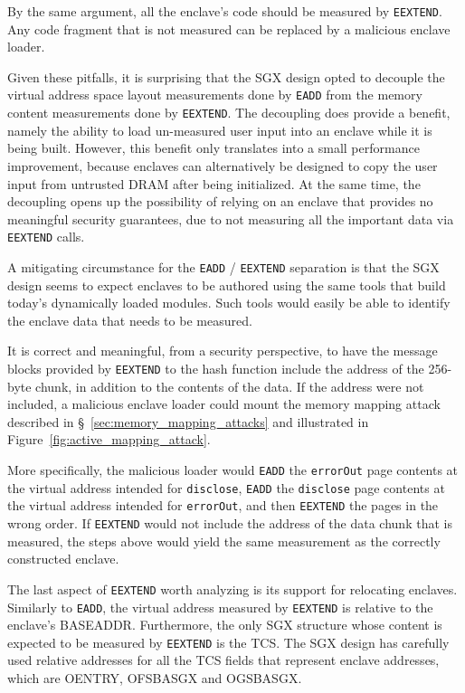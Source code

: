 By the same argument, all the enclave's code should be measured by
\texttt{EEXTEND}. Any code fragment that is not measured can be replaced by a
malicious enclave loader.

Given these pitfalls, it is surprising that the SGX design opted to decouple
the virtual address space layout measurements done by \texttt{EADD} from the
memory content measurements done by \texttt{EEXTEND}. The decoupling does
provide a benefit, namely the ability to load un-measured user input into an
enclave while it is being built. However, this benefit only translates into a
small performance improvement, because enclaves can alternatively be designed
to copy the user input from untrusted DRAM after being initialized. At the same
time, the decoupling opens up the possibility of relying on an enclave that
provides no meaningful security guarantees, due to not measuring all the
important data via \texttt{EEXTEND} calls.

A mitigating circumstance for the \texttt{EADD} / \texttt{EEXTEND} separation
is that the SGX design seems to expect enclaves to be authored using the same
tools that build today's dynamically loaded modules. Such tools would easily be
able to identify the enclave data that needs to be measured.

It is correct and meaningful, from a security perspective, to have the message
blocks provided by \texttt{EEXTEND} to the hash function include the address of
the 256-byte chunk, in addition to the contents of the data. If the address
were not included, a malicious enclave loader could mount the memory mapping
attack described in \S~\ref{sec:memory_mapping_attacks} and illustrated in
Figure~\ref{fig:active_mapping_attack}.

More specifically, the malicious loader would \texttt{EADD} the
\texttt{errorOut} page contents at the virtual address intended for
\texttt{disclose}, \texttt{EADD} the \texttt{disclose} page contents at the
virtual address intended for \texttt{errorOut}, and then \texttt{EEXTEND} the
pages in the wrong order. If \texttt{EEXTEND} would not include the address of
the data chunk that is measured, the steps above would yield the same
measurement as the correctly constructed enclave.


The last aspect of \texttt{EEXTEND} worth analyzing is its support for
relocating enclaves. Similarly to \texttt{EADD}, the virtual address measured
by \texttt{EEXTEND} is relative to the enclave's BASEADDR. Furthermore, the
only SGX structure whose content is expected to be measured by \texttt{EEXTEND}
is the TCS. The SGX design has carefully used relative addresses for all the
TCS fields that represent enclave addresses, which are OENTRY, OFSBASGX and
OGSBASGX.


